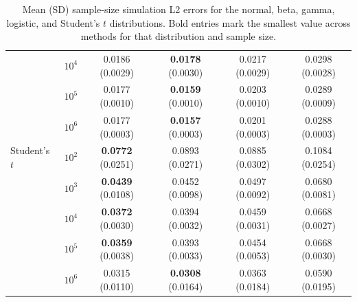 \begin{table}[p]
{\begin{tabular}{llcccc}
 & $10^4$ & 0.0186 (0.0029) & \textbf{0.0178} (0.0030) & 0.0217 (0.0029) & 0.0298 (0.0028) \\
 & $10^5$ & 0.0177 (0.0010) & \textbf{0.0159} (0.0010) & 0.0203 (0.0010) & 0.0289 (0.0009) \\
 & $10^6$ & 0.0177 (0.0003) & \textbf{0.0157} (0.0003) & 0.0201 (0.0003) & 0.0288 (0.0003) \\[0.6ex]
\midrule
Student's $t$ & $10^2$ & \textbf{0.0772} (0.0251) & 0.0893 (0.0271) & 0.0885 (0.0302) & 0.1084 (0.0254) \\
 & $10^3$ & \textbf{0.0439} (0.0108) & 0.0452 (0.0098) & 0.0497 (0.0092) & 0.0680 (0.0081) \\
 & $10^4$ & \textbf{0.0372} (0.0030) & 0.0394 (0.0032) & 0.0459 (0.0031) & 0.0668 (0.0027) \\
 & $10^5$ & \textbf{0.0359} (0.0038) & 0.0393 (0.0033) & 0.0454 (0.0053) & 0.0668 (0.0030) \\
 & $10^6$ & 0.0315 (0.0110) & \textbf{0.0308} (0.0164) & 0.0363 (0.0184) & 0.0590 (0.0195) \\[0.6ex]
\bottomrule
\end{tabular}%
}
\caption{Mean (SD) sample-size simulation L2 errors for the normal, beta, gamma, logistic, and Student's $t$ distributions. Bold entries mark the smallest value across methods for that distribution and sample size.}
\label{tab:l2_sample_size_group1_mean}
\end{table}

